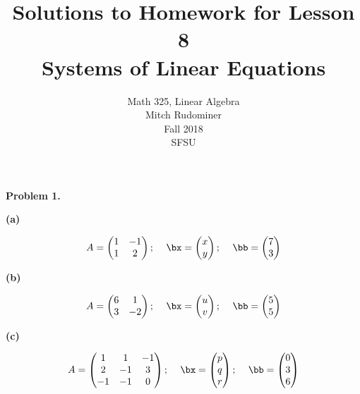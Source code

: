 \documentclass[oneside,12pt]{amsart}
\begin{document}
\title{Solutions to Homework for Lesson 8 \\ Systems of Linear Equations}
\author{Math 325, Linear Algebra \\ Mitch Rudominer \\ Fall 2018 \\ SFSU }
\date{}

\maketitle

\textbf{Problem 1.}

\smallskip

\textbf{(a)}

$$
\begin{matrix}
A=
\begin{pmatrix}
1 & -1 \\
1 & 2
\end{pmatrix}
\text{; }
&
\bx=
\begin{pmatrix}
x \\ y
\end{pmatrix}
\text{;  }
&
\bb=
\begin{pmatrix}
7 \\ 3
\end{pmatrix}
\end{matrix}
$$

\textbf{(b)}

$$
\begin{matrix}
A=
\begin{pmatrix}
6 & 1 \\
3 & -2
\end{pmatrix}
\text{; }
&
\bx=
\begin{pmatrix}
u \\ v
\end{pmatrix}
\text{;  }
&
\bb=
\begin{pmatrix}
5 \\ 5
\end{pmatrix}
\end{matrix}
$$

\textbf{(c)}

$$
\begin{matrix}
A=
\begin{pmatrix}
1 & 1  & -1\\
2 & -1 & 3 \\
-1 & -1 & 0 \\
\end{pmatrix}
\text{; }
&
\bx=
\begin{pmatrix}
p \\ q \\ r
\end{pmatrix}
\text{;  }
&
\bb=
\begin{pmatrix}
0 \\ 3 \\ 6
\end{pmatrix}
\end{matrix}
$$
\end{document}
